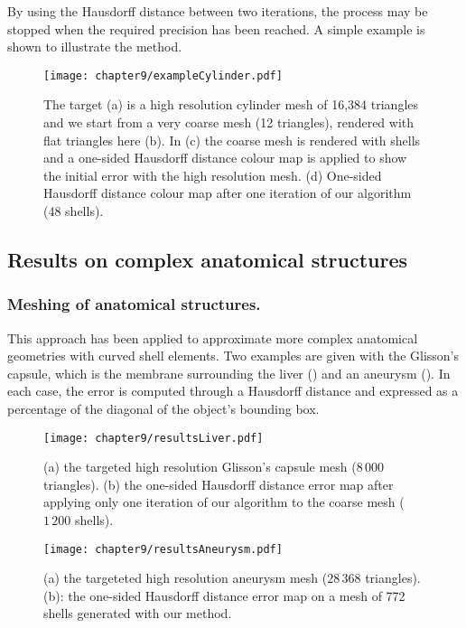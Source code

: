 By using the Hausdorff distance between two iterations, the process may be stopped when the required precision has been reached. A simple example is shown  to illustrate the method. 
\begin{figure}[ht]
\centering
\texttt{[image: chapter9/exampleCylinder.pdf]}
\caption[Meshing of a cylinder with shell elements]{The target (a) is a high resolution cylinder mesh of 16,384 triangles and we start from a very coarse mesh (12 triangles), rendered with flat triangles here (b). In (c) the coarse mesh is rendered with shells and a one-sided Hausdorff distance colour map is applied to show the initial error with the high resolution mesh. (d) One-sided Hausdorff distance colour map after one iteration of our algorithm (48 shells).}
\label{chap9:fig-cylinder}
\end{figure}

	\subsection{Results on complex anatomical structures}
	
\subsubsection*{Meshing of anatomical structures.}
This approach has been applied to approximate more complex anatomical geometries with curved shell elements. Two examples are given with the Glisson's capsule, which is the membrane surrounding the liver () and an aneurysm (). In each case, the error is computed through a Hausdorff distance and expressed as a percentage of the diagonal of the object's bounding box. 
%
\begin{figure}[ht]
\centering
\texttt{[image: chapter9/resultsLiver.pdf]}
\caption[Meshing of a liver with shell elements]{(a) the targeted high resolution Glisson's capsule mesh ($8\,000$ triangles). (b) the one-sided Hausdorff distance error map after applying only one iteration of our algorithm to the coarse mesh ($1\,200$ shells).} 
\label{chap9:fig-liver}
\end{figure}

\begin{figure}[ht]
\centering
\texttt{[image: chapter9/resultsAneurysm.pdf]}
\caption[Meshing of an aneurysm with shell elements]{(a) the targeteted high resolution aneurysm mesh ($28\,368$ triangles). (b): the one-sided Hausdorff distance error map on a mesh of 772 shells generated with our method.}
\label{chap9:fig-aneurysm}
\end{figure}

